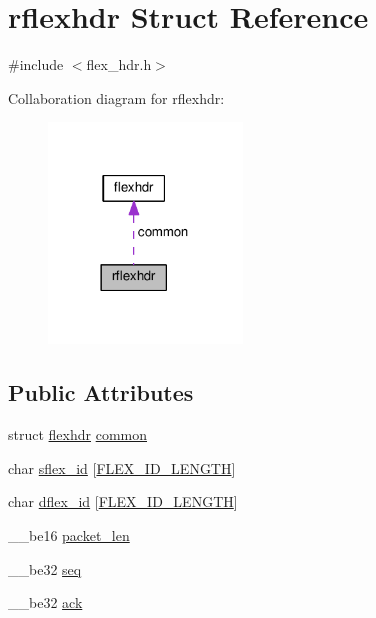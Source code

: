 \hypertarget{structrflexhdr}{}\section{rflexhdr Struct Reference}
\label{structrflexhdr}


{\ttfamily \#include $<$flex\+\_\+hdr.\+h$>$}



Collaboration diagram for rflexhdr\+:\nopagebreak
\begin{figure}[H]
\begin{center}
\leavevmode
\includegraphics[width=146pt]{structrflexhdr__coll__graph}
\end{center}
\end{figure}
\subsection*{Public Attributes}
\begin{DoxyCompactItemize}
\item 
struct \hyperlink{structflexhdr}{flexhdr} \hyperlink{structrflexhdr_a0e80ead5eb57aba13d18f75f0906569c}{common}
\item 
char \hyperlink{structrflexhdr_aa79b53451e65228d567880e512cadc3e}{sflex\+\_\+id} \mbox{[}\hyperlink{flex__const_8h_a342f27a8d723d83c803e6d934f999ada}{F\+L\+E\+X\+\_\+\+I\+D\+\_\+\+L\+E\+N\+G\+TH}\mbox{]}
\item 
char \hyperlink{structrflexhdr_a091799a62ae442e024334d0eb4cb86b6}{dflex\+\_\+id} \mbox{[}\hyperlink{flex__const_8h_a342f27a8d723d83c803e6d934f999ada}{F\+L\+E\+X\+\_\+\+I\+D\+\_\+\+L\+E\+N\+G\+TH}\mbox{]}
\item 
\+\_\+\+\_\+be16 \hyperlink{structrflexhdr_a2cc8c14fec43032de69ef360ffc4dfbe}{packet\+\_\+len}
\item 
\+\_\+\+\_\+be32 \hyperlink{structrflexhdr_a5ef194bf9db68ec8f6b050ca9608bd75}{seq}
\item 
\+\_\+\+\_\+be32 \hyperlink{structrflexhdr_ae799b07034366e7e68c5b441f816e183}{ack}
\end{DoxyCompactItemize}


